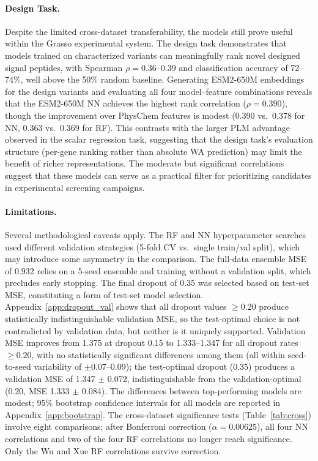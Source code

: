 \documentclass[12pt]{article}
\begin{document}
\paragraph{Design Task.}
Despite the limited cross-dataset transferability, the models still prove useful within the Grasso experimental system.
The design task demonstrates that models trained on characterized variants can meaningfully rank novel designed signal peptides, with Spearman $\rho = 0.36$--0.39 and classification accuracy of 72--74\%, well above the 50\% random baseline.
Generating ESM2-650M embeddings for the design variants and evaluating all four model--feature combinations reveals that the ESM2-650M NN achieves the highest rank correlation ($\rho = 0.390$), though the improvement over PhysChem features is modest (0.390 vs.\ 0.378 for NN, 0.363 vs.\ 0.369 for RF).
This contrasts with the larger PLM advantage observed in the scalar regression task, suggesting that the design task's evaluation structure (per-gene ranking rather than absolute WA prediction) may limit the benefit of richer representations.
The moderate but significant correlations suggest that these models can serve as a practical filter for prioritizing candidates in experimental screening campaigns.

\paragraph{Limitations.}
Several methodological caveats apply.
The RF and NN hyperparameter searches used different validation strategies (5-fold CV vs.\ single train/val split), which may introduce some asymmetry in the comparison.
The full-data ensemble MSE of 0.932 relies on a 5-seed ensemble and training without a validation split, which precludes early stopping.
The final dropout of 0.35 was selected based on test-set MSE, constituting a form of test-set model selection.
Appendix~\ref{app:dropout_val} shows that all dropout values $\geq 0.20$ produce statistically indistinguishable validation MSE, so the test-optimal choice is not contradicted by validation data, but neither is it uniquely supported.
Validation MSE improves from 1.375 at dropout 0.15 to 1.333--1.347 for all dropout rates $\geq 0.20$, with no statistically significant differences among them (all within seed-to-seed variability of $\pm$0.07--0.09); the test-optimal dropout (0.35) produces a validation MSE of 1.347 $\pm$ 0.072, indistinguishable from the validation-optimal (0.20, MSE 1.333 $\pm$ 0.084).
The differences between top-performing models are modest; 95\% bootstrap confidence intervals for all models are reported in Appendix~\ref{app:bootstrap}.
The cross-dataset significance tests (Table~\ref{tab:cross}) involve eight comparisons; after Bonferroni correction ($\alpha = 0.00625$), all four NN correlations and two of the four RF correlations no longer reach significance. Only the Wu and Xue RF correlations survive correction.
\end{document}

